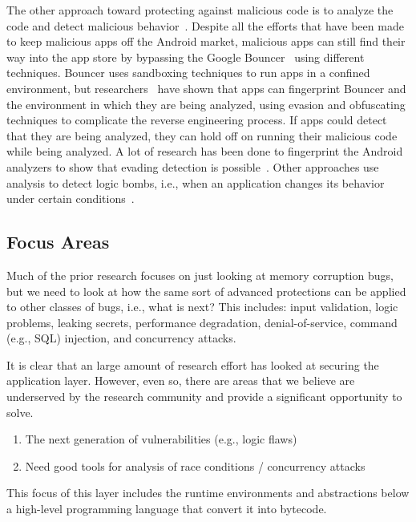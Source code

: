 \documentclass[11pt,letterpaper]{article}
\begin{document}
The other approach toward protecting against malicious code is to analyze the code and detect malicious behavior~\cite{zhou2012}. Despite all the efforts that have been made to keep malicious apps off the Android market, malicious apps can still find their way into the app store by bypassing the Google Bouncer~\cite{lockheimer:2012} using different techniques. Bouncer uses sandboxing techniques to run apps in a confined environment, but researchers~\cite{oberheide2012dissecting} have shown that apps can fingerprint Bouncer and the environment in which they are being analyzed, using evasion and obfuscating techniques to complicate the reverse engineering process. If apps could detect that they are being analyzed, they can hold off on running their malicious code while being analyzed. A lot of research has been done to fingerprint the Android analyzers to show that evading detection is possible~\cite{maier2014, jing2014, vidas2014}. Other approaches use analysis to detect logic bombs, i.e., when an application changes its behavior under certain conditions~\cite{fratantonio2016}.

\subsection{Focus Areas}

Much of the prior research focuses on just looking at memory
corruption bugs, but we need to look at how the same sort of advanced
protections can be applied to other classes of bugs, i.e., what is
next? This includes: input validation, logic problems, leaking
secrets, performance degradation, denial-of-service, command (e.g.,
SQL) injection, and concurrency attacks.


It is clear that an large amount of research effort has looked at
securing the application layer. However, even so, there are areas that
we believe are underserved by the research community and provide a
significant opportunity to solve.

\begin{enumerate}
	\item The next generation of vulnerabilities (e.g., logic flaws)
	\item Need good tools for analysis of race conditions / concurrency attacks
\end{enumerate}

This focus of this layer includes the runtime environments and abstractions
below a high-level programming language that convert it into bytecode.
\end{document}
